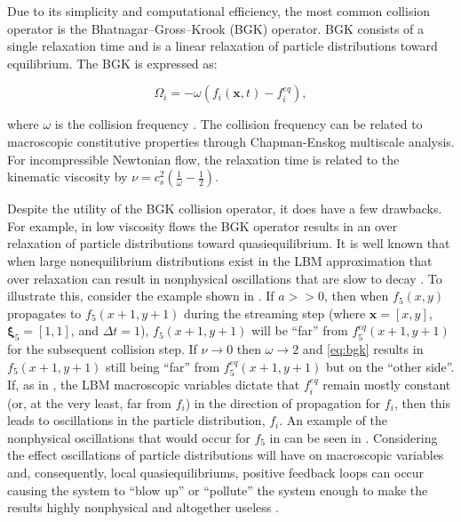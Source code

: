 \documentclass{article}
\newcommand{\pos}{\mathbf{x}}
\newcommand{\pvel}{\boldsymbol{\xi}}
\begin{document}
Due to its simplicity and computational efficiency, the most common collision operator is the Bhatnagar--Gross--Krook (BGK) operator.
BGK consists of a single relaxation time and is a linear relaxation of particle distributions toward equilibrium.
The BGK is expressed as:

\begin{equation} \label{eq:bgk}
\Omega_i = -\omega (f_i(\pos, t) - f_i^{eq}),
\end{equation}

\noindent where $\omega$ is the collision frequency \cite{Bha54}.
The collision frequency can be related to macroscopic constitutive properties through Chapman-Enskog multiscale analysis.
For incompressible Newtonian flow, the relaxation time is related to the kinematic viscosity by $\nu = c_s^2(\frac{1}{\omega} - \frac{1}{2})$.

Despite the utility of the BGK collision operator, it does have a few drawbacks.
For example, in low viscosity flows the BGK operator results in an over relaxation of particle distributions toward quasiequilibrium.
It is well known that when large nonequilibrium distributions exist in the LBM approximation that over relaxation can result in nonphysical oscillations that are slow to decay \cite{brownlee2007stability,dellar2003incompressible}.
To illustrate this, consider the example shown in .
If $a >> 0$, then when $f_5(x,y)$ propagates to $f_5(x+1,y+1)$ during the streaming step (where $\pos = [x,y]$, $\pvel_5 = [1,1]$, and $\Delta t = 1$), $f_5(x+1,y+1)$ will be ``far'' from $f^{eq}_5(x+1,y+1)$ for the subsequent collision step.
If $\nu \rightarrow 0$ then $\omega \rightarrow 2$ and \eqref{eq:bgk} results in $f_5(x+1,y+1)$ still being ``far'' from $f^{eq}_5(x+1,y+1)$ but on the ``other side''.
If, as in , the LBM macroscopic variables dictate that $f^{eq}_i$ remain mostly constant (or, at the very least, far from $f_i$) in the direction of propagation for $f_i$, then this leads to oscillations in the particle distribution, $f_i$.
An example of the nonphysical oscillations that would occur for $f_5$ in  can be seen in .
Considering the effect oscillations of particle distributions will have on macroscopic variables and, consequently, local quasiequilibriums, positive feedback loops can occur causing the system to ``blow up'' or ``pollute'' the system enough to make the results highly nonphysical and altogether useless \cite{gorban2014enhancement}.
\end{document}
